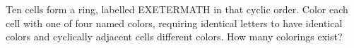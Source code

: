 Ten cells form a ring, labelled EXETERMATH in that cyclic order. Color each cell with one of four named colors, requiring identical letters to have identical colors and cyclically adjacent cells different colors. How many colorings exist?

